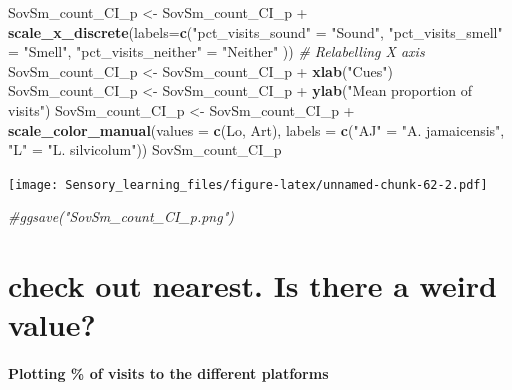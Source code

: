 \documentclass[]{article}
\newenvironment{Shaded}{\begin{snugshade}}{\end{snugshade}}
\newcommand{\KeywordTok}[1]{\textcolor[rgb]{0.13,0.29,0.53}{\textbf{{#1}}}}
\newcommand{\DataTypeTok}[1]{\textcolor[rgb]{0.13,0.29,0.53}{{#1}}}
\newcommand{\StringTok}[1]{\textcolor[rgb]{0.31,0.60,0.02}{{#1}}}
\newcommand{\CommentTok}[1]{\textcolor[rgb]{0.56,0.35,0.01}{\textit{{#1}}}}
\newcommand{\NormalTok}[1]{{#1}}
\let\oldparagraph\paragraph
\renewcommand{\paragraph}[1]{\oldparagraph{#1}\mbox{}}
\begin{document}
\begin{Shaded}
\begin{Highlighting}[]
\NormalTok{SovSm_count_CI_p <-}\StringTok{ }\NormalTok{SovSm_count_CI_p +}\StringTok{ }\KeywordTok{scale_x_discrete}\NormalTok{(}\DataTypeTok{labels=}\KeywordTok{c}\NormalTok{(}\StringTok{"pct_visits_sound"} \NormalTok{=}\StringTok{ "Sound"}\NormalTok{, }\StringTok{"pct_visits_smell"} \NormalTok{=}\StringTok{ "Smell"}\NormalTok{,}
                              \StringTok{"pct_visits_neither"} \NormalTok{=}\StringTok{ "Neither"} \NormalTok{))  }\CommentTok{# Relabelling X axis}
\NormalTok{SovSm_count_CI_p <-}\StringTok{ }\NormalTok{SovSm_count_CI_p +}\StringTok{ }\KeywordTok{xlab}\NormalTok{(}\StringTok{"Cues"}\NormalTok{)}
\NormalTok{SovSm_count_CI_p <-}\StringTok{ }\NormalTok{SovSm_count_CI_p +}\StringTok{ }\KeywordTok{ylab}\NormalTok{(}\StringTok{"Mean proportion of visits"}\NormalTok{)}
\NormalTok{SovSm_count_CI_p <-}\StringTok{ }\NormalTok{SovSm_count_CI_p +}\StringTok{  }\KeywordTok{scale_color_manual}\NormalTok{(}\DataTypeTok{values =} \KeywordTok{c}\NormalTok{(Lo, Art), }\DataTypeTok{labels =} \KeywordTok{c}\NormalTok{(}\StringTok{"AJ"} \NormalTok{=}\StringTok{ "A. jamaicensis"}\NormalTok{, }\StringTok{"L"} \NormalTok{=}\StringTok{ "L. silvicolum"}\NormalTok{))}
\NormalTok{SovSm_count_CI_p   }
\end{Highlighting}
\end{Shaded}

\texttt{[image: Sensory\_learning\_files/figure-latex/unnamed-chunk-62-2.pdf]}

\begin{Shaded}
\begin{Highlighting}[]
\CommentTok{#ggsave("SovSm_count_CI_p.png")}
\end{Highlighting}
\end{Shaded}

\section{check out nearest. Is there a weird
value?}\label{check-out-nearest.-is-there-a-weird-value-1}

\paragraph{Plotting \% of visits to the different
platforms}\label{plotting-of-visits-to-the-different-platforms}
\end{document}
